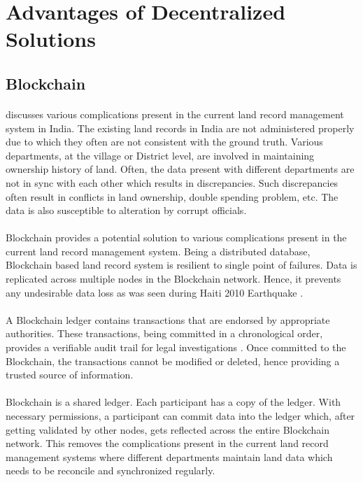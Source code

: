 \documentclass{article}
\begin{document}
\section{Advantages of Decentralized Solutions}

    \subsection{Blockchain}
        \paragraph{}
        \cite{THAKUR2020101940} discusses various complications present in the current land record management system in India. The existing land records in India are not administered properly due to which they often are not consistent with the ground truth. Various departments, at the village or District level, are involved in maintaining ownership history of land. Often, the data present with different departments are not in sync with each other which results in discrepancies. Such discrepancies often result in conflicts in land ownership, double spending problem, etc. The data is also susceptible to alteration by corrupt officials.

        \paragraph{}
        Blockchain provides a potential solution to various complications present in the current land record management system. Being a distributed database, Blockchain based land record system is resilient to single point of failures. Data is replicated across multiple nodes in the Blockchain network. Hence, it prevents any undesirable data loss as was seen during Haiti 2010 Earthquake \cite{haiti}.
        
        \paragraph{}
        A Blockchain ledger contains transactions that are endorsed by appropriate authorities. These transactions, being committed in a chronological order, provides a verifiable audit trail for legal investigations \cite{Sahlin2018BlockchainIA}. Once committed to the Blockchain, the transactions cannot be modified or deleted, hence providing a trusted source of information.

        \paragraph{}
        Blockchain is a shared ledger. Each participant has a copy of the ledger. With necessary permissions, a participant can commit data into the ledger which, after getting validated by other nodes, gets reflected across the entire Blockchain network. This removes the complications present in the current land record management systems where different departments maintain land data which needs to be reconcile and synchronized regularly.
    
\end{document}
